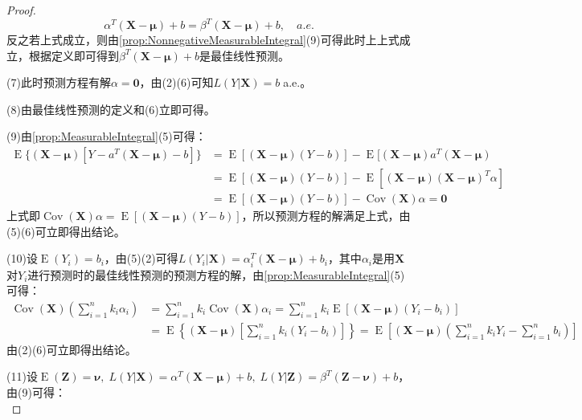 \begin{proof}
	\begin{equation*}
		\alpha^T(\mathbf{X}-\boldsymbol{\mu})+b=\beta^T(\mathbf{X}-\boldsymbol{\mu})+b,\quad a.e.
	\end{equation*}
	反之若上式成立，则由\cref{prop:NonnegativeMeasurableIntegral}(9)可得此时上上式成立，根据定义即可得到$\beta^T(\mathbf{X}-\boldsymbol{\mu})+b$是最佳线性预测。\par
	(7)此时预测方程有解$\alpha=\mathbf{0}$，由(2)(6)可知$L(Y|\mathbf{X})=b\;$a.e.。\par
	(8)由最佳线性预测的定义和(6)立即可得。\par
	(9)由\cref{prop:MeasurableIntegral}(5)可得：
	\begin{align*}
		\operatorname{E}\{(\mathbf{X}-\boldsymbol{\mu})[Y-a^T(\mathbf{X}-\boldsymbol{\mu})-b]\}&=\operatorname{E}[(\mathbf{X}-\boldsymbol{\mu})(Y-b)]-\operatorname{E}[(\mathbf{X}-\boldsymbol{\mu})a^T(\mathbf{X}-\boldsymbol{\mu}) \\
		&=\operatorname{E}[(\mathbf{X}-\boldsymbol{\mu})(Y-b)]-\operatorname{E}[(\mathbf{X}-\boldsymbol{\mu})(\mathbf{X}-\boldsymbol{\mu})^T\alpha] \\
		&=\operatorname{E}[(\mathbf{X}-\boldsymbol{\mu})(Y-b)]-\operatorname{Cov}(\mathbf{X})\alpha=\mathbf{0}
	\end{align*}
	上式即$\operatorname{Cov}(\mathbf{X})\alpha=\operatorname{E}[(\mathbf{X}-\boldsymbol{\mu})(Y-b)]$，所以预测方程的解满足上式，由(5)(6)可立即得出结论。\par
	(10)设$\operatorname{E}(Y_i)=b_i$，由(5)(2)可得$L(Y_i|\mathbf{X})=\alpha_i^T(\mathbf{X}-\boldsymbol{\mu})+b_i$，其中$\alpha_i$是用$\mathbf{X}$对$Y_i$进行预测时的最佳线性预测的预测方程的解，由\cref{prop:MeasurableIntegral}(5)可得：
	\begin{align*}
		\operatorname{Cov}(\mathbf{X})\left(\sum_{i=1}^{n}k_i\alpha_i\right)&=\sum_{i=1}^{n}k_i\operatorname{Cov}(\mathbf{X})\alpha_i=\sum_{i=1}^{n}k_i\operatorname{E}[(\mathbf{X}-\boldsymbol{\mu})(Y_i-b_i)] \\
		&=\operatorname{E}\left\{(\mathbf{X}-\boldsymbol{\mu})\left[\sum_{i=1}^{n}k_i(Y_i-b_i)\right]\right\} =\operatorname{E}\left[(\mathbf{X}-\boldsymbol{\mu})\left(\sum_{i=1}^{n}k_iY_i-\sum_{i=1}^{n}b_i\right)\right]
	\end{align*}
	由(2)(6)可立即得出结论。\par
	(11)设$\operatorname{E}(\mathbf{Z})=\boldsymbol{\nu},\;L(Y|\mathbf{X})=\alpha^T(\mathbf{X}-\boldsymbol{\mu})+b,\;L(Y|\mathbf{Z})=\beta^T(\mathbf{Z}-\boldsymbol{\nu})+b$，由(9)可得：
	\begin{equation*}

\end{equation*}
\end{proof}
